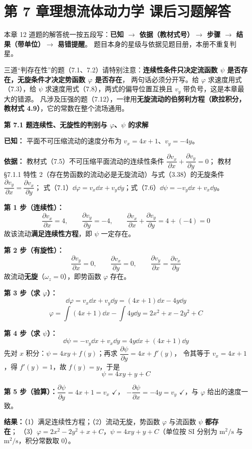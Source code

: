 \chapter*{第 7 章\quad 理想流体动力学 课后习题解答}

\begin{tishi}
本章 12 道题的解答统一按五段写：\textbf{已知 $\to$ 依据（教材式号）$\to$ 步骤 $\to$ 结果（带单位）$\to$ 易错提醒}。
题目本身的星级与依据见题目册，本册不重复判星。

三道“判存在性”的题（7.1、7.2）请特别注意：\textbf{连续性条件只决定流函数 $\psi$ 是否存在，无旋条件才决定势函数 $\varphi$ 是否存在}，
两句话必须分开写。给 $\varphi$ 求速度用式（7.3），给 $\psi$ 求速度用式（7.8），两式的偏导位置互换且 $v_y$ 带负号，这是本章最大的错源。
凡涉及压强的题（7.12），一律用\textbf{无旋流动的伯努利方程（欧拉积分，教材式 4.9）}，它的常数在整个流场通用。
\end{tishi}

\noindent\textbf{第 7.1 题\quad 连续性、无旋性的判别与 $\varphi$、$\psi$ 的求解}

\begin{jie}
\textbf{已知：} 平面不可压缩流动的速度分布为 $v_x=4x+1$、$v_y=-4y$。

\textbf{依据：} 教材式（7.5）不可压缩平面流动的连续性条件
$\dfrac{\partial v_x}{\partial x}+\dfrac{\partial v_y}{\partial y}=0$；
教材 \S7.1.1 特性 2（存在势函数的流动必是无旋流动）与式（3.38）的无旋条件
$\dfrac{\partial v_y}{\partial x}=\dfrac{\partial v_x}{\partial y}$；
式（7.1）$\dd\varphi=v_x\dd x+v_y\dd y$；式（7.6）$\dd\psi=-v_y\dd x+v_x\dd y$。

\textbf{第 1 步（连续性）：}
\[
\frac{\partial v_x}{\partial x}=4,\qquad \frac{\partial v_y}{\partial y}=-4,\qquad
\frac{\partial v_x}{\partial x}+\frac{\partial v_y}{\partial y}=4+(-4)=0
\]
故该流动\textbf{满足连续性方程}，即 \(\psi\) 一定存在。

\textbf{第 2 步（有旋性）：}
\[
\frac{\partial v_y}{\partial x}=0,\qquad \frac{\partial v_x}{\partial y}=0,\qquad
\frac{\partial v_y}{\partial x}=\frac{\partial v_x}{\partial y}
\]
故流动\textbf{无旋}（$\omega_z=0$），即势函数 \(\varphi\) 存在。

\textbf{第 3 步（求 $\varphi$）：}
\[
\dd\varphi=v_x\dd x+v_y\dd y=(4x+1)\dd x-4y\dd y
\]
\[
\varphi=\int(4x+1)\dd x-\int 4y\dd y=2x^2+x-2y^2+C
\]

\textbf{第 4 步（求 $\psi$）：}
\[
\dd\psi=-v_y\dd x+v_x\dd y=4y\dd x+(4x+1)\dd y
\]
先对 $x$ 积分：$\psi=4xy+f(y)$；再求 $\dfrac{\partial\psi}{\partial y}=4x+f'(y)$，
令其等于 $v_x=4x+1$，得 $f'(y)=1$，故 $f(y)=y$，于是
\[
\psi=4xy+y+C
\]

\textbf{第 5 步（验算）：}$\dfrac{\partial\psi}{\partial y}=4x+1=v_x$ $\checkmark$，
$-\dfrac{\partial\psi}{\partial x}=-4y=v_y$ $\checkmark$，与 $\varphi$ 给出的速度一致。

\textbf{结果：}（1）满足连续性方程；（2）流动无旋，势函数 $\varphi$ 与流函数 $\psi$ \textbf{都存在}；
（3）$\varphi=2x^2-2y^2+x+C$，$\psi=4xy+y+C$（单位按 SI 分别为 $\mathrm{m^2/s}$ 与 $\mathrm{m^2/s}$，积分常数取 0）。
\end{jie}

